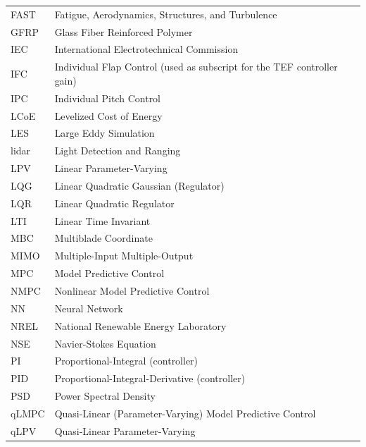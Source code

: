 \begin{longtable}{ll}
    {FAST} & {Fatigue, Aerodynamics, Structures, and Turbulence}\\
    {GFRP} & {Glass Fiber Reinforced Polymer} \\
    {IEC} & {International Electrotechnical Commission} \\
    {IFC} & {Individual Flap Control (used as subscript for the TEF controller gain)}\\
    {IPC} & {Individual Pitch Control} \\
    {LCoE} & {Levelized Cost of Energy} \\
    {LES} & {Large Eddy Simulation} \\
    {lidar} & {Light Detection and Ranging}\\
    {LPV} & {Linear Parameter-Varying} \\
    {LQG} & {Linear Quadratic Gaussian (Regulator)}\\
    {LQR} & {Linear Quadratic Regulator}\\
    {LTI} & {Linear Time Invariant} \\
    {MBC} & {Multiblade Coordinate}\\
    {MIMO} & {Multiple-Input Multiple-Output} \\
    {MPC} & {Model Predictive Control} \\
    {NMPC} & {Nonlinear Model Predictive Control} \\
    {NN} & {Neural Network} \\
    {NREL} & {National Renewable Energy Laboratory} \\
    {NSE} & {Navier-Stokes Equation}\\
    {PI}  & {Proportional-Integral (controller)}\\
    {PID}  & {Proportional-Integral-Derivative (controller)}\\
    {PSD}  & {Power Spectral Density}\\
    {qLMPC}  & {Quasi-Linear (Parameter-Varying) Model Predictive Control}\\
    {qLPV}  & {Quasi-Linear Parameter-Varying}\\

\end{longtable}
